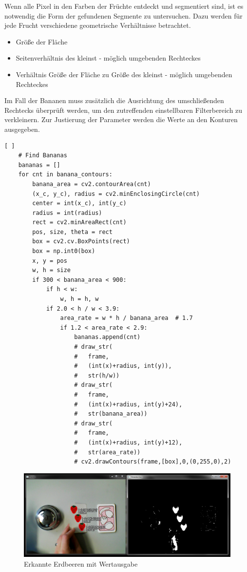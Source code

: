 Wenn alle Pixel in den Farben der Früchte entdeckt und segmentiert sind, ist es notwendig die Form der gefundenen Segmente zu untersuchen. Dazu werden für jede Frucht verschiedene geometrische Verhältnisse betrachtet.
\begin{itemize}
    \item Größe der Fläche
    \item Seitenverhältnis des kleinst - möglich umgebenden Rechteckes
    \item Verhältnis Größe der Fläche zu Größe des kleinst - möglich umgebenden Rechteckes
\end{itemize}
Im Fall der Bananen muss zusätzlich die Ausrichtung des umschließenden Rechtecks überprüft werden, um den zutreffenden einstellbaren Filterbereich zu verkleinern. 
Zur Justierung der Parameter werden die Werte an den Konturen ausgegeben.
\lstset{language=Python}
\begin{lstlisting}[ ]
    # Find Bananas
    bananas = []
    for cnt in banana_contours:
        banana_area = cv2.contourArea(cnt)
        (x_c, y_c), radius = cv2.minEnclosingCircle(cnt)
        center = int(x_c), int(y_c)
        radius = int(radius)
        rect = cv2.minAreaRect(cnt)
        pos, size, theta = rect
        box = cv2.cv.BoxPoints(rect)
        box = np.int0(box)
        x, y = pos
        w, h = size
        if 300 < banana_area < 900:
            if h < w:
                w, h = h, w
            if 2.0 < h / w < 3.9:
                area_rate = w * h / banana_area  # 1.7
                if 1.2 < area_rate < 2.9:
                    bananas.append(cnt)
                    # draw_str(
                    #   frame,
                    #   (int(x)+radius, int(y)),
                    #   str(h/w))
                    # draw_str(
                    #   frame,
                    #   (int(x)+radius, int(y)+24),
                    #   str(banana_area))
                    # draw_str(
                    #   frame,
                    #   (int(x)+radius, int(y)+12),
                    #   str(area_rate))
                    # cv2.drawContours(frame,[box],0,(0,255,0),2)
\end{lstlisting}
\begin{figure}[H]
    \centering
    \includegraphics[width=\textwidth]{Abbildungen/Erdbeeren03}
    \caption[ ]{Erkannte Erdbeeren mit Wertausgabe}
    \label{fig:Erdbeeren03}
\end{figure}
